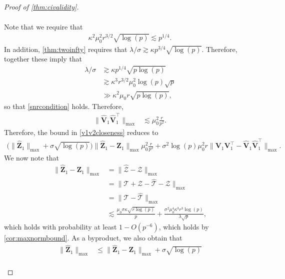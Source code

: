 \documentclass[10pt]{article}
\newcommand{\0}{{\mathbf{0}}}
\newcommand{\1}{{\mathbf{1}}}
\renewcommand{\t}{^{\top}}
\renewcommand{\hat}{\widehat}
\renewcommand{\hat}{\widehat}
\begin{document}
\begin{proof}[Proof of \cref{thm:civalidity}]
\begin{itemize}
\begin{align}
\end{align}
Note that we require that
\begin{align*}
    \kappa^2 \mu_0^2 r^{3/2} \sqrt{\log(p)} \lesssim p^{1/4}.
\end{align*}
In addition, \cref{thm:twoinfty} requires that $\lambda/\sigma \gtrsim \kappa p^{3/4} \sqrt{\log(p)}$.  Therefore, together these imply that
\begin{align*}
    \lambda/\sigma &\gtrsim \kappa p^{1/4} \sqrt{p\log(p)} \\
    &\gtrsim \kappa^3 r^{3/2} \mu_0^2 \log(p) \sqrt{p} \\
    &\gg \kappa^2 \mu_0 r \sqrt{p\log(p)},
\end{align*}
so that \cref{snrcondition} holds. Therefore,
\begin{align*}
    \| \mathbf{\hat V}_1 \mathbf{\hat V}_1\t \|_{\max} &\lesssim \mu_0^2 \frac{r}{p^2}.
\end{align*}
Therefore, the bound in \eqref{v1v2closeness} reduces to
\begin{align}
     \bigg( \| \mathbf{\hat Z}_1 \|_{\max} + \sigma \sqrt{\log(p)} \bigg) \| \mathbf{\hat Z}_1 - \mathbf{Z}_1 \|_{\max} \mu_0^2 \frac{r}{p^2} + \sigma^2 \log(p) \mu_0^2 r  \| \mathbf{V}_1 \mathbf{V}_1\t - \mathbf{\hat V}_1 \mathbf{\hat V}_1\t \|_{\max}.  \label{v1v2bd2}
\end{align}
We now note that
\begin{align*}
    \| \mathbf{\hat Z}_1 - \mathbf{Z}_1 \|_{\max} &= \| \mathcal{\hat Z} - \mathcal{Z} \|_{\max} \\
    &= \| \mathcal{T + Z - \hat T - Z} \|_{\max} \\
    &= \| \mathcal{T - \hat T} \|_{\max} \\
    &\lesssim  \frac{\mu_0\sigma \kappa  \sqrt{r\log(p)}  }{p} +  \frac{\sigma^2 \mu_0^4 \kappa^3 r^3 \log(p)}{\lambda \sqrt{p}}, %
\end{align*}
which holds with probability at least $1 - O(p^{-6})$, which holds by \cref{cor:maxnormbound}. As a byproduct, we also obtain that
\begin{align*}
    \| \mathbf{\hat Z}_1 \|_{\max} &\leq \| \mathbf{\hat Z}_1 - \mathbf{Z}_1 \|_{\max} + \sigma \sqrt{\log(p)} \\

\end{align*}
\end{itemize}
\end{proof}
\end{document}
